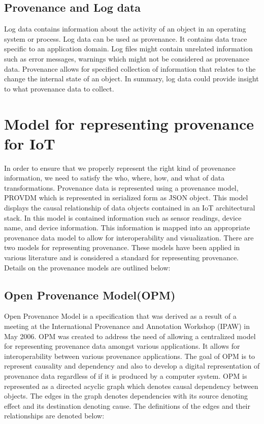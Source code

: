 \subsection{Provenance and Log data}
Log data contains information about the activity of an object in an operating system or process. Log data can be used as provenance. It contains data trace specific to an application domain. Log files might contain unrelated information such as error messages, warnings which might not be considered as provenance data. Provenance allows for specified collection of information that relates to the change the internal state of an object. In summary, log data could provide insight to what provenance data to collect. 

\section{Model for representing provenance for IoT}

In order to ensure that we properly represent the right kind of provenance information, we need to satisfy the who, where, how, and what of data transformations. Provenance data is represented using a provenance model, PROV\-DM which is represented in serialized form as JSON object. This model displays the causal relationship of data objects contained in an IoT architectural stack. In this model is contained information such as sensor readings, device name, and device information. This information is mapped into an appropriate provenance data model to allow for interoperability and visualization. There are two models for representing provenance. These models \cite{prov_dm} have been applied in various literature and is considered a standard for representing provenance. Details on the provenance models are outlined below:

\subsection{Open Provenance Model(OPM)}

Open Provenance Model \cite{moreau_open_2011} is a specification that was derived as a result of a meeting at the International Provenance and Annotation Workshop (IPAW) in May 2006. OPM was created to address the need of allowing a centralized model for representing provenance data amongst various applications. It allows for interoperability between various provenance applications. The goal of OPM is to represent causality and dependency and also to develop a digital representation of provenance data regardless of if it is produced by a computer system. OPM is represented as a directed acyclic graph which denotes causal dependency between objects. The edges in the graph denotes dependencies with its source denoting effect and its destination denoting cause. The definitions of the edges and their relationships are denoted below: 

